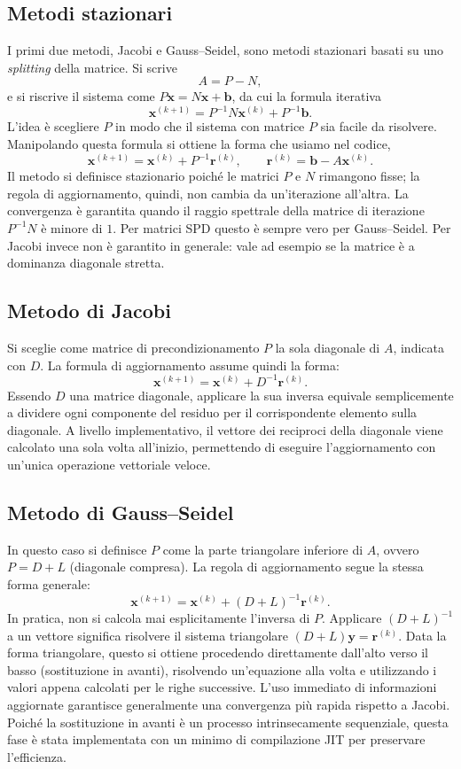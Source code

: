 \documentclass[11pt,a4paper]{article}
\begin{document}
\subsection{Metodi stazionari}
I primi due metodi, Jacobi e Gauss--Seidel, sono metodi stazionari basati su uno
\emph{splitting} della matrice. Si scrive
\[
A=P-N,
\]
e si riscrive il sistema come $P\mathbf{x}=N\mathbf{x}+\mathbf{b}$, da cui la
formula iterativa
\[
\mathbf{x}^{(k+1)}=P^{-1}N\mathbf{x}^{(k)}+P^{-1}\mathbf{b}.
\]
L'idea è scegliere $P$ in modo che il sistema con matrice $P$ sia facile da
risolvere. Manipolando questa formula si ottiene la forma che usiamo nel
codice,
\[
\mathbf{x}^{(k+1)}=\mathbf{x}^{(k)}+P^{-1}\mathbf{r}^{(k)},
\qquad \mathbf{r}^{(k)}=\mathbf{b}-A\mathbf{x}^{(k)}.
\]
Il metodo si definisce stazionario poiché le matrici $P$ e $N$ rimangono
fisse; la regola di aggiornamento, quindi, non cambia da un'iterazione
all'altra. La convergenza è garantita quando il raggio spettrale della
matrice di iterazione $P^{-1}N$ è minore di $1$. Per matrici SPD questo è sempre
vero per Gauss--Seidel. Per Jacobi invece non è garantito in generale: vale ad
esempio se la matrice è a dominanza diagonale stretta.

\subsection{Metodo di Jacobi}
Si sceglie come matrice di precondizionamento $P$ la sola diagonale di $A$,
indicata con $D$. La formula di aggiornamento assume quindi la forma:
\[
\mathbf{x}^{(k+1)}=\mathbf{x}^{(k)} + D^{-1}\mathbf{r}^{(k)}.
\]
Essendo $D$ una matrice diagonale, applicare la sua inversa equivale
semplicemente a dividere ogni componente del residuo per il corrispondente
elemento sulla diagonale. A livello implementativo, il vettore dei reciproci
della diagonale viene calcolato una sola volta all'inizio, permettendo di
eseguire l'aggiornamento con un'unica operazione vettoriale veloce.

\subsection{Metodo di Gauss--Seidel}
In questo caso si definisce $P$ come la parte triangolare inferiore di $A$,
ovvero $P = D + L$ (diagonale compresa). La regola di aggiornamento segue la
stessa forma generale:
\[
\mathbf{x}^{(k+1)}=\mathbf{x}^{(k)} + (D+L)^{-1}\mathbf{r}^{(k)}.
\]
In pratica, non si calcola mai esplicitamente l'inversa di $P$. Applicare
$(D+L)^{-1}$ a un vettore significa risolvere il sistema triangolare
$(D+L)\mathbf{y} = \mathbf{r}^{(k)}$. Data la forma triangolare, questo si
ottiene procedendo direttamente dall'alto verso il basso (sostituzione in
avanti), risolvendo un'equazione alla volta e utilizzando i valori appena
calcolati per le righe successive. L'uso immediato di informazioni aggiornate
garantisce generalmente una convergenza più rapida rispetto a Jacobi. Poiché
la sostituzione in avanti è un processo intrinsecamente sequenziale, questa
fase è stata implementata con un minimo di compilazione JIT per preservare
l'efficienza.
\end{document}
